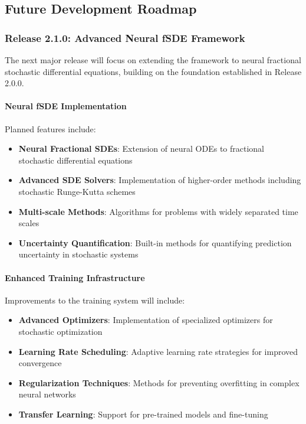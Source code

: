 \subsection{Future Development Roadmap}

\subsubsection{Release 2.1.0: Advanced Neural fSDE Framework}

The next major release will focus on extending the framework to neural fractional stochastic differential equations, building on the foundation established in Release 2.0.0.

\paragraph{Neural fSDE Implementation}
Planned features include:

\begin{itemize}
    \item \textbf{Neural Fractional SDEs}: Extension of neural ODEs to fractional stochastic differential equations
    \item \textbf{Advanced SDE Solvers}: Implementation of higher-order methods including stochastic Runge-Kutta schemes
    \item \textbf{Multi-scale Methods}: Algorithms for problems with widely separated time scales
    \item \textbf{Uncertainty Quantification}: Built-in methods for quantifying prediction uncertainty in stochastic systems
\end{itemize}

\paragraph{Enhanced Training Infrastructure}
Improvements to the training system will include:

\begin{itemize}
    \item \textbf{Advanced Optimizers}: Implementation of specialized optimizers for stochastic optimization
    \item \textbf{Learning Rate Scheduling}: Adaptive learning rate strategies for improved convergence
    \item \textbf{Regularization Techniques}: Methods for preventing overfitting in complex neural networks
    \item \textbf{Transfer Learning}: Support for pre-trained models and fine-tuning
\end{itemize}

